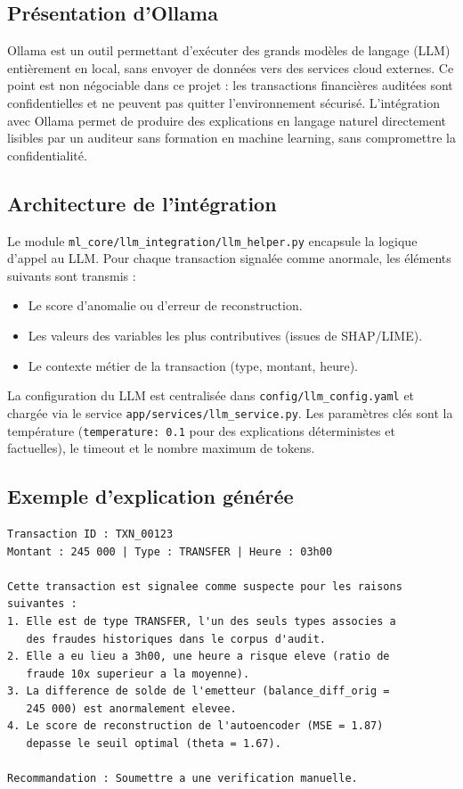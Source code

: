 \documentclass[12pt,a4paper,twoside]{report}
\begin{document}
\subsection{Présentation d'Ollama}

Ollama est un outil permettant d'exécuter des grands modèles de langage (LLM) entièrement en local, sans envoyer de données vers des services cloud externes. Ce point est non négociable dans ce projet : les transactions financières auditées sont confidentielles et ne peuvent pas quitter l'environnement sécurisé. L'intégration avec Ollama permet de produire des explications en langage naturel directement lisibles par un auditeur sans formation en machine learning, sans compromettre la confidentialité.

\subsection{Architecture de l'intégration}

Le module \texttt{ml\_core/llm\_integration/llm\_helper.py} encapsule la logique d'appel au LLM. Pour chaque transaction signalée comme anormale, les éléments suivants sont transmis :

\begin{itemize}
  \item Le score d'anomalie ou d'erreur de reconstruction.
  \item Les valeurs des variables les plus contributives (issues de SHAP/LIME).
  \item Le contexte métier de la transaction (type, montant, heure).
\end{itemize}

La configuration du LLM est centralisée dans \texttt{config/llm\_config.yaml} et chargée via le service \texttt{app/services/llm\_service.py}. Les paramètres clés sont la température (\texttt{temperature: 0.1} pour des explications déterministes et factuelles), le timeout et le nombre maximum de tokens.

\subsection{Exemple d'explication générée}

\begin{lstlisting}[caption={Exemple d'explication Ollama pour une transaction suspecte},label={lst:ollama_example}]
Transaction ID : TXN_00123
Montant : 245 000 | Type : TRANSFER | Heure : 03h00

Cette transaction est signalee comme suspecte pour les raisons
suivantes :
1. Elle est de type TRANSFER, l'un des seuls types associes a
   des fraudes historiques dans le corpus d'audit.
2. Elle a eu lieu a 3h00, une heure a risque eleve (ratio de
   fraude 10x superieur a la moyenne).
3. La difference de solde de l'emetteur (balance_diff_orig =
   245 000) est anormalement elevee.
4. Le score de reconstruction de l'autoencoder (MSE = 1.87)
   depasse le seuil optimal (theta = 1.67).

Recommandation : Soumettre a une verification manuelle.
\end{lstlisting}
\end{document}
